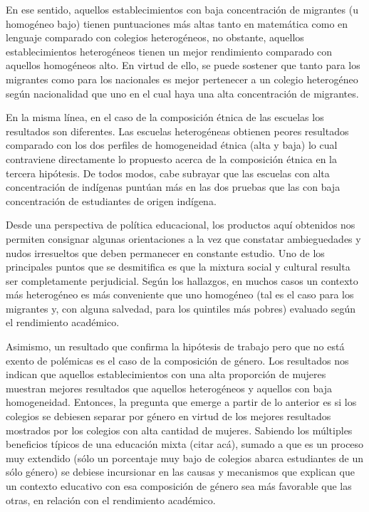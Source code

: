 \documentclass[
]{article}
\begin{document}
En ese sentido, aquellos establecimientos con baja concentración de
migrantes (u homogéneo bajo) tienen puntuaciones más altas tanto en
matemática como en lenguaje comparado con colegios heterogéneos, no
obstante, aquellos establecimientos heterogéneos tienen un mejor
rendimiento comparado con aquellos homogéneos alto. En virtud de ello,
se puede sostener que tanto para los migrantes como para los nacionales
es mejor pertenecer a un colegio heterogéneo según nacionalidad que uno
en el cual haya una alta concentración de migrantes.

En la misma línea, en el caso de la composición étnica de las escuelas
los resultados son diferentes. Las escuelas heterogéneas obtienen peores
resultados comparado con los dos perfiles de homogeneidad étnica (alta y
baja) lo cual contraviene directamente lo propuesto acerca de la
composición étnica en la tercera hipótesis. De todos modos, cabe
subrayar que las escuelas con alta concentración de indígenas puntúan
más en las dos pruebas que las con baja concentración de estudiantes de
origen indígena.

Desde una perspectiva de política educacional, los productos aquí
obtenidos nos permiten consignar algunas orientaciones a la vez que
constatar ambieguedades y nudos irresueltos que deben permanecer en
constante estudio. Uno de los principales puntos que se desmitifica es
que la mixtura social y cultural resulta ser completamente perjudicial.
Según los hallazgos, en muchos casos un contexto más heterogéneo es más
conveniente que uno homogéneo (tal es el caso para los migrantes y, con
alguna salvedad, para los quintiles más pobres) evaluado según el
rendimiento académico.

Asimismo, un resultado que confirma la hipótesis de trabajo pero que no
está exento de polémicas es el caso de la composición de género. Los
resultados nos indican que aquellos establecimientos con una alta
proporción de mujeres muestran mejores resultados que aquellos
heterogéneos y aquellos con baja homogeneidad. Entonces, la pregunta que
emerge a partir de lo anterior es si los colegios se debiesen separar
por género en virtud de los mejores resultados mostrados por los
colegios con alta cantidad de mujeres. Sabiendo los múltiples beneficios
típicos de una educación mixta (citar acá), sumado a que es un proceso
muy extendido (sólo un porcentaje muy bajo de colegios abarca
estudiantes de un sólo género) se debiese incursionar en las causas y
mecanismos que explican que un contexto educativo con esa composición de
género sea más favorable que las otras, en relación con el rendimiento
académico.
\end{document}
